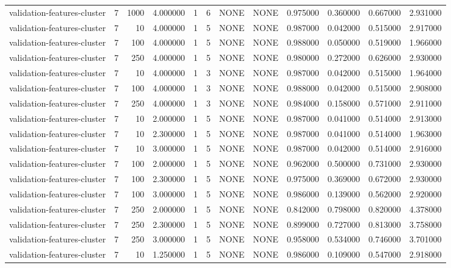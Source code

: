 \begin{tabular}{lrrrllllrrrr}
validation-features-cluster & 7 & 1000 & 4.000000 & 1 & 6 & NONE & NONE & 0.975000 & 0.360000 & 0.667000 & 2.931000 \\
validation-features-cluster & 7 & 10 & 4.000000 & 1 & 5 & NONE & NONE & 0.987000 & 0.042000 & 0.515000 & 2.917000 \\
validation-features-cluster & 7 & 100 & 4.000000 & 1 & 5 & NONE & NONE & 0.988000 & 0.050000 & 0.519000 & 1.966000 \\
validation-features-cluster & 7 & 250 & 4.000000 & 1 & 5 & NONE & NONE & 0.980000 & 0.272000 & 0.626000 & 2.930000 \\
validation-features-cluster & 7 & 10 & 4.000000 & 1 & 3 & NONE & NONE & 0.987000 & 0.042000 & 0.515000 & 1.964000 \\
validation-features-cluster & 7 & 100 & 4.000000 & 1 & 3 & NONE & NONE & 0.988000 & 0.042000 & 0.515000 & 2.908000 \\
validation-features-cluster & 7 & 250 & 4.000000 & 1 & 3 & NONE & NONE & 0.984000 & 0.158000 & 0.571000 & 2.911000 \\
validation-features-cluster & 7 & 10 & 2.000000 & 1 & 5 & NONE & NONE & 0.987000 & 0.041000 & 0.514000 & 2.913000 \\
validation-features-cluster & 7 & 10 & 2.300000 & 1 & 5 & NONE & NONE & 0.987000 & 0.041000 & 0.514000 & 1.963000 \\
validation-features-cluster & 7 & 10 & 3.000000 & 1 & 5 & NONE & NONE & 0.987000 & 0.042000 & 0.514000 & 2.916000 \\
validation-features-cluster & 7 & 100 & 2.000000 & 1 & 5 & NONE & NONE & 0.962000 & 0.500000 & 0.731000 & 2.930000 \\
validation-features-cluster & 7 & 100 & 2.300000 & 1 & 5 & NONE & NONE & 0.975000 & 0.369000 & 0.672000 & 2.930000 \\
validation-features-cluster & 7 & 100 & 3.000000 & 1 & 5 & NONE & NONE & 0.986000 & 0.139000 & 0.562000 & 2.920000 \\
validation-features-cluster & 7 & 250 & 2.000000 & 1 & 5 & NONE & NONE & 0.842000 & 0.798000 & 0.820000 & 4.378000 \\
validation-features-cluster & 7 & 250 & 2.300000 & 1 & 5 & NONE & NONE & 0.899000 & 0.727000 & 0.813000 & 3.758000 \\
validation-features-cluster & 7 & 250 & 3.000000 & 1 & 5 & NONE & NONE & 0.958000 & 0.534000 & 0.746000 & 3.701000 \\
validation-features-cluster & 7 & 10 & 1.250000 & 1 & 5 & NONE & NONE & 0.986000 & 0.109000 & 0.547000 & 2.918000 \\

\end{tabular}
